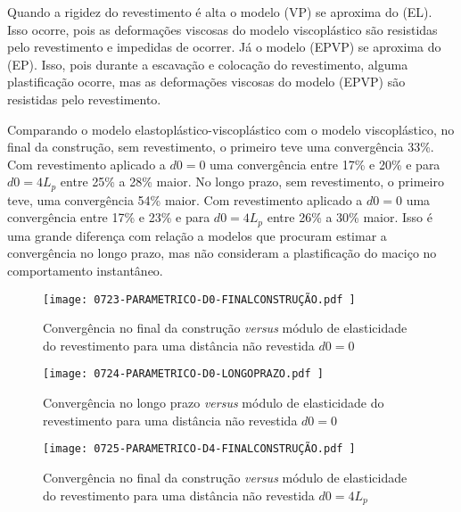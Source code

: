 Quando a rigidez do revestimento é alta o modelo (VP) se aproxima do (EL). Isso ocorre, pois as deformações viscosas do modelo viscoplástico são resistidas pelo revestimento e impedidas de ocorrer. Já o modelo (EPVP) se aproxima do (EP). Isso, pois durante a escavação e colocação do revestimento, alguma plastificação ocorre, mas as deformações viscosas do modelo (EPVP) são resistidas pelo revestimento.

Comparando o modelo elastoplástico-viscoplástico com o modelo viscoplástico, no final da construção, sem revestimento, o primeiro teve uma convergência 33\%. Com revestimento aplicado a $d0=0$ uma convergência entre 17\% e 20\% e para $d0=4L_p$ entre 25\% a 28\% maior. No longo prazo, sem revestimento, o primeiro teve, uma convergência 54\% maior. Com revestimento aplicado a $d0=0$ uma convergência entre 17\% e 23\% e para $d0=4L_p$ entre 26\% a 30\% maior. Isso é uma grande diferença com relação a modelos que procuram estimar a convergência no longo prazo, mas não consideram a plastificação do maciço no comportamento instantâneo.

\begin{figure}[H]
	\begin{center}
		\texttt{[image: 0723-PARAMETRICO-D0-FINALCONSTRUÇÃO.pdf
		]}
	\end{center}
	\caption{\label{PARAMETRICO-D0-FINALCONSTRUÇÃO}Convergência no final da construção \textit{versus} módulo de elasticidade do revestimento para uma distância não revestida $d0=0$}
\end{figure}

\begin{figure}[H]
	\begin{center}
		\texttt{[image: 0724-PARAMETRICO-D0-LONGOPRAZO.pdf
		]}
	\end{center}
	\caption{\label{PARAMETRICO-D0-LONGOPRAZO}Convergência no longo prazo \textit{versus} módulo de elasticidade do revestimento para uma distância não revestida $d0=0$}
\end{figure}

\begin{figure}[H]
	\begin{center}
		\texttt{[image: 0725-PARAMETRICO-D4-FINALCONSTRUÇÃO.pdf
		]}
	\end{center}
	\caption{\label{PARAMETRICO-D4-FINALCONSTRUÇÃO}Convergência no final da construção \textit{versus} módulo de elasticidade do revestimento para uma distância não revestida $d0=4L_p$}
\end{figure}

